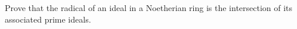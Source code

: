 Prove that the radical of an ideal in a Noetherian ring is the intersection of its associated prime ideals.
